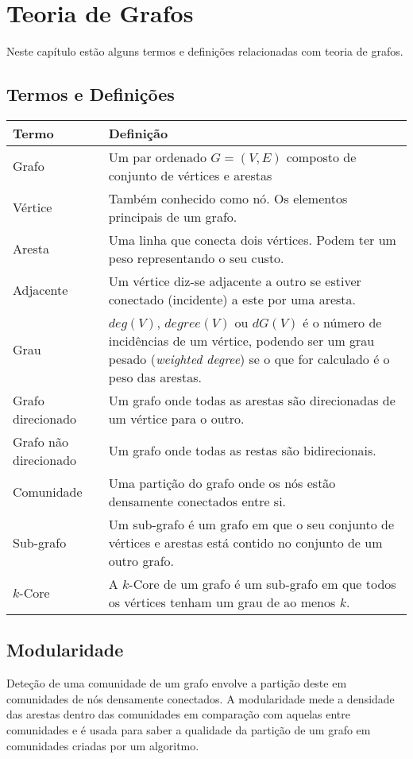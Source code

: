 \chapter{Teoria de Grafos}
Neste capítulo estão alguns termos e definições relacionadas com teoria de grafos.
\section{Termos e Definições}
		\begin{tabular}{|l | p{12cm} |}
			\hline
			\textbf{Termo} & \textbf{Definição} \\ \hline
			Grafo & Um par ordenado $G = (V,E)$ composto de conjunto de vértices e arestas \\ \hline
			Vértice & Também conhecido como nó. Os elementos principais de um grafo. \\ \hline
			Aresta & Uma linha que conecta dois vértices. Podem ter um peso representando o seu custo. \\ \hline
			Adjacente & Um vértice diz-se adjacente a outro se estiver conectado (incidente) a este por uma aresta. \\ \hline
			Grau & $deg(V)$, $degree(V)$ ou $dG(V)$ é o número de incidências de um vértice, podendo ser um grau pesado (\textit{weighted degree}) se o que for calculado é o peso das arestas. \\ \hline
			Grafo direcionado & Um grafo onde todas as arestas são direcionadas de um vértice para o outro. \\ \hline
			Grafo não direcionado & Um grafo onde todas as restas são bidirecionais. \\ \hline
			Comunidade & Uma partição do grafo onde os nós estão densamente conectados entre si. \\ \hline
			Sub-grafo & Um sub-grafo é um grafo em que o seu conjunto de vértices e arestas está contido no conjunto de um outro grafo. \\ \hline
			$k$-Core & A $k$-Core de um grafo é um sub-grafo em que todos os vértices tenham um grau de ao menos $k$. \\ \hline
		\end{tabular}

\section{Modularidade}
Deteção de uma comunidade de um grafo envolve a partição deste em comunidades de nós densamente conectados. A modularidade mede a densidade das arestas dentro das comunidades em comparação com aquelas entre comunidades e é usada para saber a qualidade da partição de um grafo em comunidades criadas por um algoritmo. 


